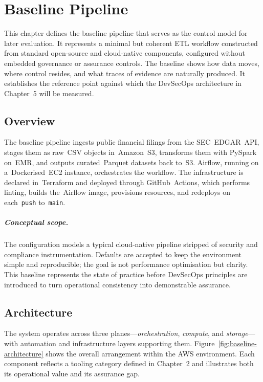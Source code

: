 \chapter{Baseline Pipeline}
\label{ch:baseline}

\noindent
This chapter defines the baseline pipeline that serves as the control
model for later evaluation. It represents a minimal but coherent ETL workflow
constructed from standard open-source and cloud-native components, configured
without embedded governance or assurance controls. The baseline shows how data
moves, where control resides, and what traces of evidence are naturally
produced. It establishes the reference point against which the DevSecOps
architecture in Chapter~5 will be measured.

\section{Overview}
\noindent
The baseline pipeline ingests public financial filings from the
SEC~EDGAR~API, stages them as raw~CSV objects in~Amazon~S3, transforms them with
PySpark on~EMR, and outputs curated~Parquet datasets back to~S3. Airflow,
running on a~Dockerised~EC2 instance, orchestrates the workflow. The
infrastructure is declared in~Terraform and deployed through GitHub~Actions,
which performs linting, builds the~Airflow image, provisions resources, and
redeploys on each~\texttt{push} to~\texttt{main}.  

\paragraph{Conceptual scope.}
The configuration models a typical cloud-native pipeline stripped of security
and compliance instrumentation. Defaults are accepted to keep the environment
simple and reproducible; the goal is not performance optimisation but clarity.
This baseline represents the state of practice before DevSecOps principles are
introduced to turn operational consistency into demonstrable assurance.

\section{Architecture}
\noindent
The system operates across three planes—\emph{orchestration}, \emph{compute},
and \emph{storage}—with automation and infrastructure layers supporting them.
Figure~\ref{fig:baseline-architecture} shows the overall arrangement within the
AWS environment. Each component reflects a tooling category defined
in Chapter~2 and illustrates both its operational value and its assurance gap.

